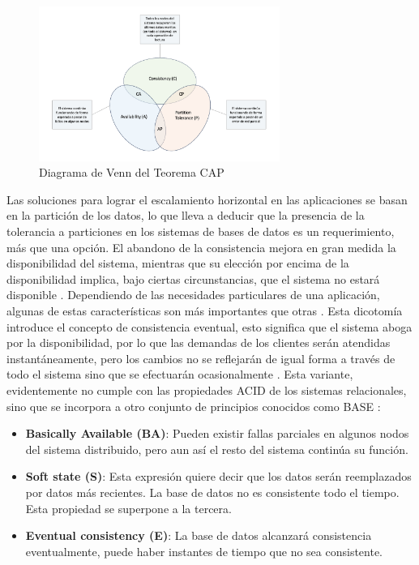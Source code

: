 \begin{figure}[h!]
    \centering
    \includegraphics[width=0.7\textwidth]{Images/cap-theorem.png}
    \caption{Diagrama de Venn del Teorema CAP}
    \label{fig:cap-theorem}
\end{figure}


Las soluciones para lograr el escalamiento horizontal en las aplicaciones se basan en la partición de los datos, lo que lleva a deducir que la presencia de la tolerancia a particiones en los sistemas de bases de datos es un requerimiento, más que una opción. 
El abandono de la consistencia mejora en gran medida la disponibilidad del sistema, mientras que su elección por encima de la disponibilidad implica, bajo ciertas circunstancias, que el sistema no estará disponible \cite{vogels2008eventually}. 
Dependiendo de las necesidades particulares de una aplicación, algunas de estas características son más importantes que otras \cite{pokorny2011nosql}.
Esta dicotomía introduce el concepto de consistencia eventual, esto significa que el sistema aboga por la disponibilidad, por lo que las demandas de los clientes serán atendidas instantáneamente, pero los cambios no se reflejarán de igual forma a través de todo el sistema sino que se efectuarán ocasionalmente \cite{vogels2008eventually}.
Esta variante, evidentemente no cumple con las propiedades ACID de los sistemas relacionales, sino que se incorpora a otro conjunto de principios conocidos como BASE \cites*{pokorny2011nosql,vogels2008eventually}:

\begin{itemize}
    \item \textbf{Basically Available (BA)}: Pueden existir fallas parciales en algunos nodos del sistema distribuido, pero aun así el resto del sistema continúa su función.
    \item \textbf{Soft state (S)}: Esta expresión quiere decir que los datos serán reemplazados por datos más recientes. La base de datos no es consistente todo el tiempo. Esta propiedad se superpone a la tercera.
    \item \textbf{Eventual consistency (E)}: La base de datos alcanzará consistencia eventualmente, puede haber instantes de tiempo que no sea consistente.
\end{itemize}


